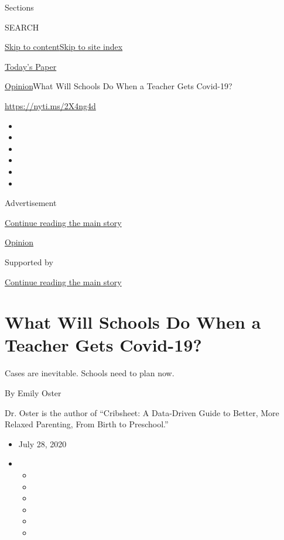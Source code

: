 Sections

SEARCH

\protect\hyperlink{site-content}{Skip to
content}\protect\hyperlink{site-index}{Skip to site index}

\href{https://myaccount.nytimes3xbfgragh.onion/auth/login?response_type=cookie\&client_id=vi}{}

\href{https://www.nytimes3xbfgragh.onion/section/todayspaper}{Today's
Paper}

\href{/section/opinion}{Opinion}\textbar{}What Will Schools Do When a
Teacher Gets Covid-19?

\url{https://nyti.ms/2X4ng4d}

\begin{itemize}
\item
\item
\item
\item
\item
\item
\end{itemize}

Advertisement

\protect\hyperlink{after-top}{Continue reading the main story}

\href{/section/opinion}{Opinion}

Supported by

\protect\hyperlink{after-sponsor}{Continue reading the main story}

\hypertarget{what-will-schools-do-when-a-teacher-gets-covid-19}{%
\section{What Will Schools Do When a Teacher Gets
Covid-19?}\label{what-will-schools-do-when-a-teacher-gets-covid-19}}

Cases are inevitable. Schools need to plan now.

By Emily Oster

Dr. Oster is the author of ``Cribsheet: A Data-Driven Guide to Better,
More Relaxed Parenting, From Birth to Preschool.''

\begin{itemize}
\item
  July 28, 2020
\item
  \begin{itemize}
  \item
  \item
  \item
  \item
  \item
  \item
  \end{itemize}
\end{itemize}

